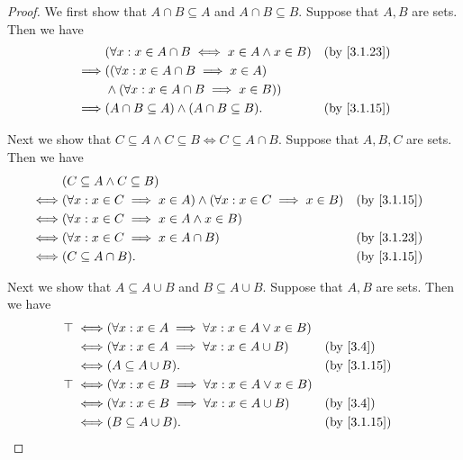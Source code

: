 \begin{proof}
  We first show that \(A \cap B \subseteq A\) and \(A \cap B \subseteq B\).
  Suppose that \(A, B\) are sets.
  Then we have
  \begin{align*}
             & (\forall x : x \in A \cap B \iff x \in A \land x \in B) &  & \by{3.1.23} \\
    \implies & ((\forall x : x \in A \cap B \implies x \in A)                           \\
             & \land (\forall x : x \in A \cap B \implies x \in B))                     \\
    \implies & (A \cap B \subseteq A) \land (A \cap B \subseteq B).    &  & \by{3.1.15}
  \end{align*}

  Next we show that \(C \subseteq A \land C \subseteq B \iff C \subseteq A \cap B\).
  Suppose that \(A, B, C\) are sets.
  Then we have
  \begin{align*}
         & (C \subseteq A \land C \subseteq B)                                                                  \\
    \iff & (\forall x : x \in C \implies x \in A) \land (\forall x : x \in C \implies x \in B) &  & \by{3.1.15} \\
    \iff & (\forall x : x \in C \implies x \in A \land x \in B)                                                 \\
    \iff & (\forall x : x \in C \implies x \in A \cap B)                                       &  & \by{3.1.23} \\
    \iff & (C \subseteq A \cap B).                                                             &  & \by{3.1.15}
  \end{align*}

  Next we show that \(A \subseteq A \cup B\) and \(B \subseteq A \cup B\).
  Suppose that \(A, B\) are sets.
  Then we have
  \begin{align*}
    \top \iff & (\forall x : x \in A \implies \forall x : x \in A \lor x \in B)                  \\
    \iff      & (\forall x : x \in A \implies \forall x : x \in A \cup B)       &  & \by{3.4}    \\
    \iff      & (A \subseteq A \cup B).                                         &  & \by{3.1.15} \\
    \top \iff & (\forall x : x \in B \implies \forall x : x \in A \lor x \in B)                  \\
    \iff      & (\forall x : x \in B \implies \forall x : x \in A \cup B)       &  & \by{3.4}    \\
    \iff      & (B \subseteq A \cup B).                                         &  & \by{3.1.15}
  \end{align*}


\end{proof}
